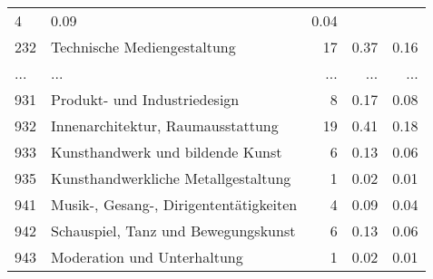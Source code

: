 \begin{longtable}{lXrrr}
          \num{4} &
          \num[round-mode=places,round-precision=2]{0.09} &
          \num[round-mode=places,round-precision=2]{0.04} \\
        232 & \multicolumn{1}{X}{Technische Mediengestaltung} & %
          \num{17} &
          \num[round-mode=places,round-precision=2]{0.37} &
          \num[round-mode=places,round-precision=2]{0.16} \\
       ... & ... & ... & ... & ... \\
        931 & \multicolumn{1}{X}{Produkt- und Industriedesign} & %
          \num{8} &
          \num[round-mode=places,round-precision=2]{0.17} &
          \num[round-mode=places,round-precision=2]{0.08} \\

        932 & \multicolumn{1}{X}{Innenarchitektur, Raumausstattung} & %
          \num{19} &
          \num[round-mode=places,round-precision=2]{0.41} &
          \num[round-mode=places,round-precision=2]{0.18} \\

        933 & \multicolumn{1}{X}{Kunsthandwerk und bildende Kunst} & %
          \num{6} &
          \num[round-mode=places,round-precision=2]{0.13} &
          \num[round-mode=places,round-precision=2]{0.06} \\

        935 & \multicolumn{1}{X}{Kunsthandwerkliche Metallgestaltung} & %
          \num{1} &
          \num[round-mode=places,round-precision=2]{0.02} &
          \num[round-mode=places,round-precision=2]{0.01} \\

        941 & \multicolumn{1}{X}{Musik-, Gesang-, Dirigententätigkeiten} & %
          \num{4} &
          \num[round-mode=places,round-precision=2]{0.09} &
          \num[round-mode=places,round-precision=2]{0.04} \\

        942 & \multicolumn{1}{X}{Schauspiel, Tanz und Bewegungskunst} & %
          \num{6} &
          \num[round-mode=places,round-precision=2]{0.13} &
          \num[round-mode=places,round-precision=2]{0.06} \\

        943 & \multicolumn{1}{X}{Moderation und Unterhaltung} & %
          \num{1} &
          \num[round-mode=places,round-precision=2]{0.02} &
          \num[round-mode=places,round-precision=2]{0.01} \\


\end{longtable}
